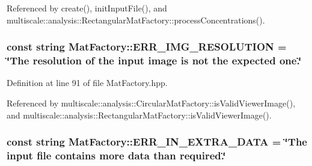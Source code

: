 \-Referenced by create(), init\-Input\-File(), and multiscale\-::analysis\-::\-Rectangular\-Mat\-Factory\-::process\-Concentrations().

\hypertarget{classmultiscale_1_1analysis_1_1MatFactory_ab5e9403dc7f8465189d444f909d473e7}{
\subsubsection[{\-E\-R\-R\-\_\-\-I\-M\-G\-\_\-\-R\-E\-S\-O\-L\-U\-T\-I\-O\-N}]{\setlength{\rightskip}{0pt plus 5cm}const string {\bf \-Mat\-Factory\-::\-E\-R\-R\-\_\-\-I\-M\-G\-\_\-\-R\-E\-S\-O\-L\-U\-T\-I\-O\-N} = \char`\"{}\-The resolution of the input image is not the expected one.\char`\"{}}}\label{classmultiscale_1_1analysis_1_1MatFactory_ab5e9403dc7f8465189d444f909d473e7}


\-Definition at line 91 of file \-Mat\-Factory.\-hpp.



\-Referenced by multiscale\-::analysis\-::\-Circular\-Mat\-Factory\-::is\-Valid\-Viewer\-Image(), and multiscale\-::analysis\-::\-Rectangular\-Mat\-Factory\-::is\-Valid\-Viewer\-Image().

\hypertarget{classmultiscale_1_1analysis_1_1MatFactory_a09459b632d5b01f184ce0f56245f5905}{
\subsubsection[{\-E\-R\-R\-\_\-\-I\-N\-\_\-\-E\-X\-T\-R\-A\-\_\-\-D\-A\-T\-A}]{\setlength{\rightskip}{0pt plus 5cm}const string {\bf \-Mat\-Factory\-::\-E\-R\-R\-\_\-\-I\-N\-\_\-\-E\-X\-T\-R\-A\-\_\-\-D\-A\-T\-A} = \char`\"{}\-The input file contains more data than required.\char`\"{}}}\label{classmultiscale_1_1analysis_1_1MatFactory_a09459b632d5b01f184ce0f56245f5905}


